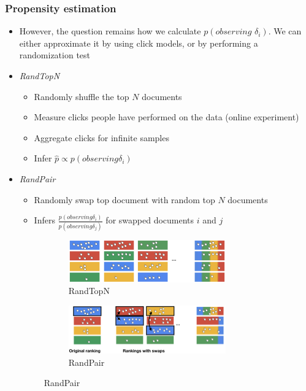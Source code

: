 \subsubsection{Propensity estimation}
\begin{itemize}
	\item However, the question remains how we calculate $p(\textit{observing }\delta_i)$. We can either approximate it by using click models, or by performing a randomization test
	\item \textit{RandTopN}
	\begin{itemize}
		\item Randomly shuffle the top $N$ documents
		\item Measure clicks people have performed on the data (online experiment)
		\item Aggregate clicks for infinite samples
		\item Infer $\hat{p} \propto p(\textit{observing} \delta_i)$
	\end{itemize} 
	\item \textit{RandPair}
	\begin{itemize}
		\item Randomly swap top document with random top $N$ documents
		\item Infers $\frac{p(\textit{observing} \delta_i)}{p(\textit{observing} \delta_j)}$ for swapped documents $i$ and $j$
	\end{itemize}
	\begin{figure}[ht]
		\centering
		\begin{subfigure}[b]{0.45\textwidth}
			\centering
			\includegraphics[width=0.8\textwidth]{figures/counterfactual_LTR_RandTopN.png}
			\caption{RandTopN}
		\end{subfigure}
		\begin{subfigure}[b]{0.45\textwidth}
			\centering
			\includegraphics[width=0.8\textwidth]{figures/counterfactual_LTR_RandPair.png}
			\caption{RandPair}
		\end{subfigure}
		\label{img:counterfactual_propensity_estimation}
	\end{figure}
\end{itemize}
